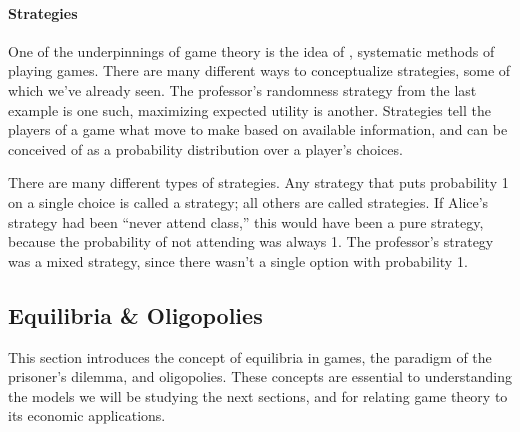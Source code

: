 \documentclass[letterpaper,10pt,english]{jupyterBook}
\begin{document}
\paragraph{Strategies}
\label{\detokenize{content/07-game-theory/expected-utility:strategies}}
\sphinxAtStartPar
One of the underpinnings of game theory is the idea of , systematic methods of playing games. There are many different ways to conceptualize strategies, some of which we’ve already seen. The professor’s randomness strategy from the last example is one such, maximizing expected utility is another. Strategies tell the players of a game what move to make based on available information, and can be conceived of as a probability distribution over a player’s choices.

\sphinxAtStartPar
There are many different types of strategies. Any strategy that puts probability 1 on a single choice is called a  strategy; all others are called  strategies. If Alice’s strategy had been “never attend class,” this would have been a pure strategy, because the probability of not attending was always 1. The professor’s strategy was a mixed strategy, since there wasn’t a single option with probability 1.


\subsection{Equilibria \& Oligopolies}
\label{\detokenize{content/07-game-theory/equilibria-oligopolies:equilibria-oligopolies}}\label{\detokenize{content/07-game-theory/equilibria-oligopolies::doc}}
\sphinxAtStartPar
This section introduces the concept of equilibria in games, the paradigm of the prisoner’s dilemma, and oligopolies. These concepts are essential to understanding the models we will be studying the next sections, and for relating game theory to its economic applications.
\end{document}
